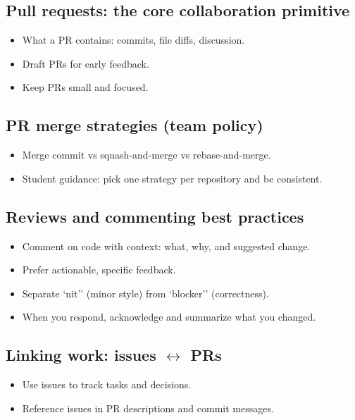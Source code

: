 \subsection{Pull requests: the core collaboration primitive}
\begin{itemize}
\item What a PR contains: commits, file diffs, discussion.
\item Draft PRs for early feedback.
\item Keep PRs small and focused.
\end{itemize}

\subsection{PR merge strategies (team policy)}
\begin{itemize}
\item Merge commit vs squash-and-merge vs rebase-and-merge.
\item Student guidance: pick one strategy per repository and be consistent.
\end{itemize}

\subsection{Reviews and commenting best practices}
\begin{itemize}
\item Comment on code with context: what, why, and suggested change.
\item Prefer actionable, specific feedback.
\item Separate `nit'' (minor style) from `blocker'' (correctness).
\item When you respond, acknowledge and summarize what you changed.
\end{itemize}

\subsection{Linking work: issues $\leftrightarrow$ PRs}
\begin{itemize}
\item Use issues to track tasks and decisions.
\item Reference issues in PR descriptions and commit messages.
\end{itemize}

